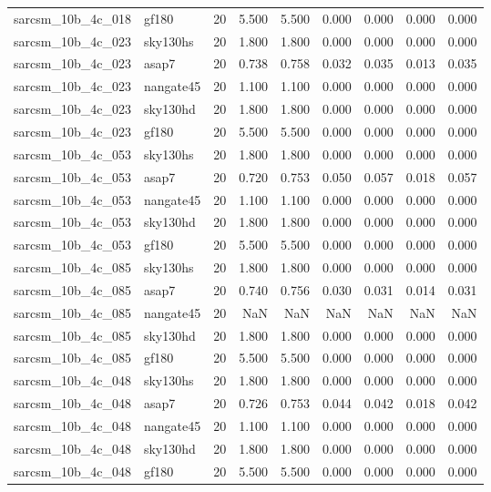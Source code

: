 \begin{tabular}{llrrrrrrr}
sarcsm\_10b\_4c\_018 & gf180 & 20 & 5.500 & 5.500 & 0.000 & 0.000 & 0.000 & 0.000 \\
sarcsm\_10b\_4c\_023 & sky130hs & 20 & 1.800 & 1.800 & 0.000 & 0.000 & 0.000 & 0.000 \\
sarcsm\_10b\_4c\_023 & asap7 & 20 & 0.738 & 0.758 & 0.032 & 0.035 & 0.013 & 0.035 \\
sarcsm\_10b\_4c\_023 & nangate45 & 20 & 1.100 & 1.100 & 0.000 & 0.000 & 0.000 & 0.000 \\
sarcsm\_10b\_4c\_023 & sky130hd & 20 & 1.800 & 1.800 & 0.000 & 0.000 & 0.000 & 0.000 \\
sarcsm\_10b\_4c\_023 & gf180 & 20 & 5.500 & 5.500 & 0.000 & 0.000 & 0.000 & 0.000 \\
sarcsm\_10b\_4c\_053 & sky130hs & 20 & 1.800 & 1.800 & 0.000 & 0.000 & 0.000 & 0.000 \\
sarcsm\_10b\_4c\_053 & asap7 & 20 & 0.720 & 0.753 & 0.050 & 0.057 & 0.018 & 0.057 \\
sarcsm\_10b\_4c\_053 & nangate45 & 20 & 1.100 & 1.100 & 0.000 & 0.000 & 0.000 & 0.000 \\
sarcsm\_10b\_4c\_053 & sky130hd & 20 & 1.800 & 1.800 & 0.000 & 0.000 & 0.000 & 0.000 \\
sarcsm\_10b\_4c\_053 & gf180 & 20 & 5.500 & 5.500 & 0.000 & 0.000 & 0.000 & 0.000 \\
sarcsm\_10b\_4c\_085 & sky130hs & 20 & 1.800 & 1.800 & 0.000 & 0.000 & 0.000 & 0.000 \\
sarcsm\_10b\_4c\_085 & asap7 & 20 & 0.740 & 0.756 & 0.030 & 0.031 & 0.014 & 0.031 \\
sarcsm\_10b\_4c\_085 & nangate45 & 20 & NaN & NaN & NaN & NaN & NaN & NaN \\
sarcsm\_10b\_4c\_085 & sky130hd & 20 & 1.800 & 1.800 & 0.000 & 0.000 & 0.000 & 0.000 \\
sarcsm\_10b\_4c\_085 & gf180 & 20 & 5.500 & 5.500 & 0.000 & 0.000 & 0.000 & 0.000 \\
sarcsm\_10b\_4c\_048 & sky130hs & 20 & 1.800 & 1.800 & 0.000 & 0.000 & 0.000 & 0.000 \\
sarcsm\_10b\_4c\_048 & asap7 & 20 & 0.726 & 0.753 & 0.044 & 0.042 & 0.018 & 0.042 \\
sarcsm\_10b\_4c\_048 & nangate45 & 20 & 1.100 & 1.100 & 0.000 & 0.000 & 0.000 & 0.000 \\
sarcsm\_10b\_4c\_048 & sky130hd & 20 & 1.800 & 1.800 & 0.000 & 0.000 & 0.000 & 0.000 \\
sarcsm\_10b\_4c\_048 & gf180 & 20 & 5.500 & 5.500 & 0.000 & 0.000 & 0.000 & 0.000 \\

\end{tabular}
